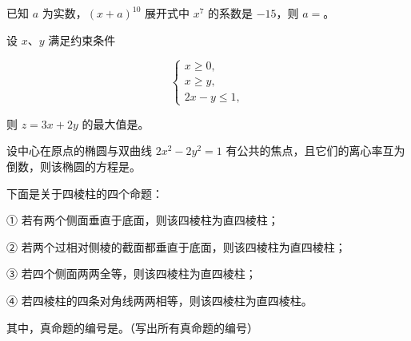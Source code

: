 \begin{question}
已知 $a$ 为实数，$(x+a)^{10}$ 展开式中 $x^7$ 的系数是 $-15$，则 $a=$\gkblank{}。

\end{question}
\begin{question}
设 $x\text{、}y$ 满足约束条件

\nopagebreak[4]
\[
\begin{cases}
x\geqslant0,\\
x\geqslant y,\\
2x-y\leqslant1,
\end{cases}
\]

则 $z=3x+2y$ 的最大值是\gkblank{}。

\end{question}
\begin{question}
设中心在原点的椭圆与双曲线 $2x^2-2y^2=1$ 有公共的焦点，且它们的离心率互为倒数，则该椭圆的方程是\gkblank{}。

\end{question}
\begin{question}
下面是关于四棱柱的四个命题：

① 若有两个侧面垂直于底面，则该四棱柱为直四棱柱；

② 若两个过相对侧棱的截面都垂直于底面，则该四棱柱为直四棱柱；

③ 若四个侧面两两全等，则该四棱柱为直四棱柱；

④ 若四棱柱的四条对角线两两相等，则该四棱柱为直四棱柱。

其中，真命题的编号是\gkblank{}。（写出所有真命题的编号）

\end{question}

